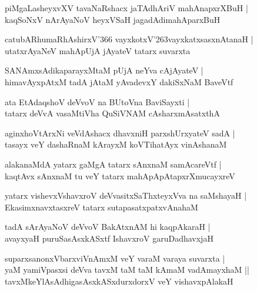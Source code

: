 \documentclass[twoside,12pt,openright]{book}
\def\S{\char'263}
\newcounter{shloka}[chapter]
\begin{document}
\begin{shloka}%
piMgaLasheyxvXV tavaNaRshacx jaTAdhAriV mahAnapxrXBuH |\\
kaqSoNxV nArAyaNoV heyxVSaH jagadAdimahAparxBuH 
\end{shloka}

\begin{shloka}%
catubARhumaRhAshirxV\char'366 vayxkotxV\S vayxkatxsasxnAtanaH |\\
utatxrAyaNeV mahApUjA jAyateV tatarx suvarxta
\end{shloka}

\begin{shloka}%
SANAmxsAdikaparayxMtaM pUjA neYva cAjAyateV |\\
himavAyxpAtxM tadA jAtaM yAvadevxY dakiSxNaM BaveVtf 
\end{shloka}

\begin{shloka}%
ata EtAdaqshoV deVvoV na BUtoVna BaviSayxti |\\
tatarx deVvA vasaMtiVha QuSiVNAM cAsharxmAsatxthA 
\end{shloka}

\begin{shloka}%
aginxhoVtArxNi veVdAshacx dhavxniH parxshUrxyateV sadA |\\
tasayx veY dashaRnaM kArayxM koVTihatAyx vinAshanaM 
\end{shloka}

\begin{shloka}%
alakanaMdA yatarx gaMgA tatarx sAnxnaM samAcareVtf |\\
kaqtAvx sAnxnaM tu veY tatarx mahApApAtapxrXmucayxreV 
\end{shloka}

\begin{shloka}%
yatarx vishevxVshavxroV deVvasitxSaThxteyxVva na saMshayaH |\\
EkasimxnavxtasxreV tatarx sutapasatxpatxvAnahaM 
\end{shloka}

\begin{shloka}%
tadA sArAyaNoV deVvoV BakAtxnAM hi kaqpAkaraH |\\
avayxyaH puruSasAsxkASxtf IshavxroV garuDadhavxjaH 
\end{shloka}

\begin{shloka}%
suparxsanonxVbarxviVnAmxM veY varaM varaya suvarxta |\\
yaM yamiVpasxsi deVva tavxM taM taM kAmaM vadAmayxhaM ||\\
tavxMkeYlAsAdhigasAsxkASxdurxdorxV veY vishavxpAlakaH  
\end{shloka}
\end{document}
